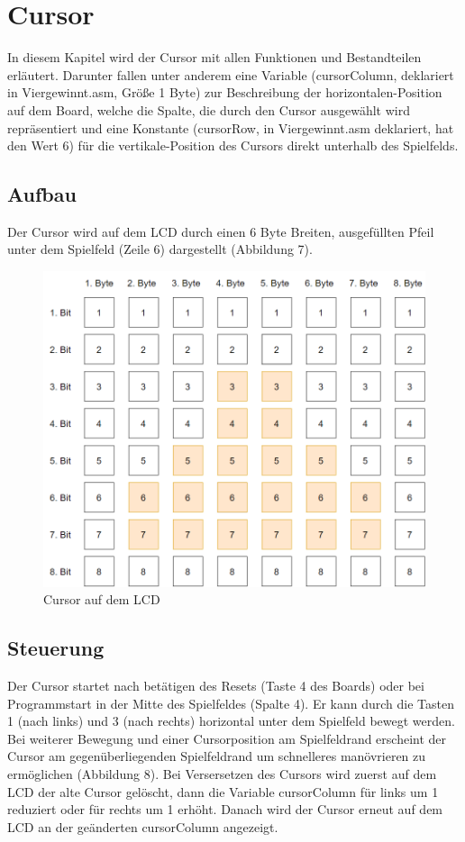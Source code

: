 \newpage
\section{Cursor}
    In diesem Kapitel wird der Cursor mit allen Funktionen und Bestandteilen erläutert.
    Darunter fallen unter anderem eine Variable (cursorColumn, deklariert in Viergewinnt.asm, Größe 1 Byte)
    zur Beschreibung der horizontalen-Position auf dem Board, welche die Spalte, die durch den Cursor ausgewählt wird repräsentiert und eine Konstante
    (cursorRow, in Viergewinnt.asm deklariert, hat den Wert 6) für die vertikale-Position des Cursors direkt unterhalb des Spielfelds.

    \subsection{Aufbau}
        Der Cursor wird auf dem LCD durch einen 6 Byte Breiten, ausgefüllten Pfeil unter dem Spielfeld (Zeile 6) dargestellt (Abbildung 7).

        \begin{figure}[H]
            \centering
            \includegraphics[scale=0.35]{img/cursor.png}    
            \caption{Cursor auf dem LCD}
        \end{figure}
    
    \subsection{Steuerung}
        Der Cursor startet nach betätigen des Resets (Taste 4 des Boards) oder bei Programmstart in der Mitte des Spielfeldes (Spalte 4).
        Er kann durch die Tasten 1 (nach links) und 3 (nach rechts) horizontal unter dem Spielfeld bewegt werden.
        Bei weiterer Bewegung und einer Cursorposition am Spielfeldrand erscheint der Cursor am gegenüberliegenden Spielfeldrand um schnelleres manövrieren zu ermöglichen (Abbildung 8).
        Bei Versersetzen des Cursors wird zuerst auf dem LCD der alte Cursor gelöscht,
        dann die Variable cursorColumn für links um 1 reduziert oder für rechts um 1 erhöht.
        Danach wird der Cursor erneut auf dem LCD an der geänderten cursorColumn angezeigt.

